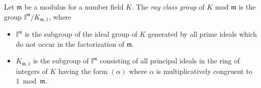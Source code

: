 \documentclass[12pt]{article}
\newcommand{\m}{{\mathfrak{m}}}
\begin{document}
Let $\m$ be a modulus for a number field $K$. The {\em ray class group} of $K$ mod $\m$ is the group $\mathbb{I}^\m/K_{\m,1}$, where
\begin{itemize}
\item $\mathbb{I}^\m$ is the subgroup of the ideal group of $K$ generated by all prime ideals which do not occur in the factorization of $\m$.
\item $K_{\m,1}$ is the subgroup of $\mathbb{I}^\m$ consisting of all principal ideals in the ring of integers of $K$ having the form $(\alpha)$ where $\alpha$ is multiplicatively congruent to $1 \bmod \m$.
\end{itemize}
\end{document}
